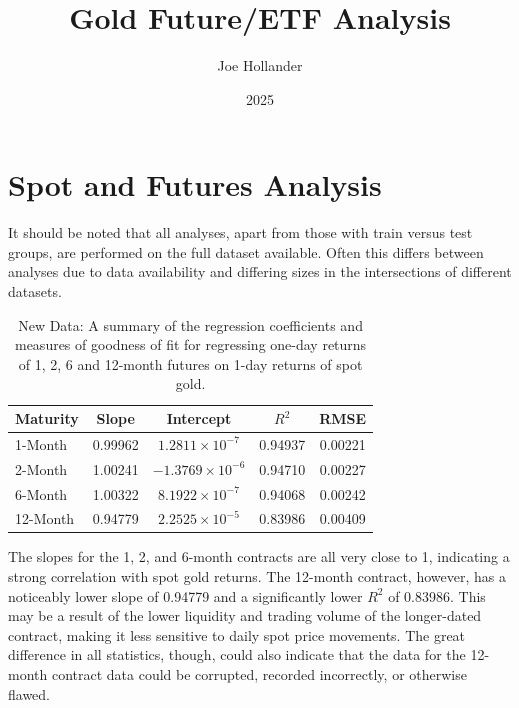 \documentclass{article}
\title{Gold Future/ETF Analysis}
\author{Joe Hollander}
\date{2025}
\begin{document}
\maketitle

\section{Spot and Futures Analysis}

It should be noted that all analyses, apart from those with train versus test groups, are performed on the full dataset available.
Often this differs between analyses due to data availability and differing sizes in the intersections of different datasets.

\begin{table}[h!]
\centering
\begin{tabular}{lcccc}
\toprule
\textbf{Maturity} & \textbf{Slope} & \textbf{Intercept} & \textbf{$R^2$} & \textbf{RMSE} \\
\midrule
1-Month   & 0.99962 & \phantom{$-$}$1.2811 \times 10^{-7}$ & 0.94937 & 0.00221 \\
2-Month   & 1.00241 & $-1.3769 \times 10^{-6}$ & 0.94710 & 0.00227 \\
6-Month   & 1.00322 & \phantom{$-$}$8.1922 \times 10^{-7}$ & 0.94068 & 0.00242 \\
12-Month  & 0.94779 & \phantom{$-$}$2.2525 \times 10^{-5}$ & 0.83986 & 0.00409 \\
\bottomrule
\end{tabular}
\caption{New Data: A summary of the regression coefficients and measures of goodness of fit for regressing one-day returns of 1, 2, 6 and 12-month futures on 1-day returns of spot gold.}
\label{tab:new_data_summary}
\end{table}

The slopes for 
the 1, 2, and 6-month contracts are all 
very close to 1, 
indicating a strong correlation with spot gold returns.
The 12-month contract, however, has a noticeably lower slope of 0.94779
and a significantly lower $R^2$ of 0.83986.
This may be a result of the lower liquidity and trading volume of the longer-dated contract, 
making it less sensitive to daily spot price movements.
The great difference in all statistics, though,
could also indicate that the data for the 12-month contract data could be corrupted, recorded incorrectly, or otherwise flawed.
\end{document}
